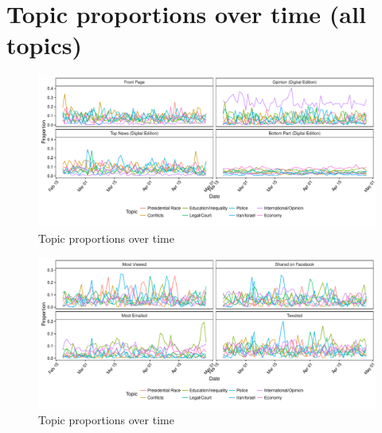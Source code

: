 \documentclass[12pt]{article}
\begin{document}
\clearpage
\section{Topic proportions over time (all topics)}\label{app:series}
\renewcommand\thefigure{\thesection.\arabic{figure}}
\renewcommand\thetable{\thesection.\arabic{table}}
\setcounter{figure}{0}
\setcounter{table}{0}

\begin{figure}[h]
\caption{Topic proportions over time}\label{fig:series_nyt}
\includegraphics[width=\textwidth]{../calc/fig/series_nyt} 
\end{figure}

\begin{figure}[h]
\caption{Topic proportions over time}\label{fig:series_share}
\includegraphics[width=\textwidth]{../calc/fig/series_share} 
\end{figure}
\end{document}
